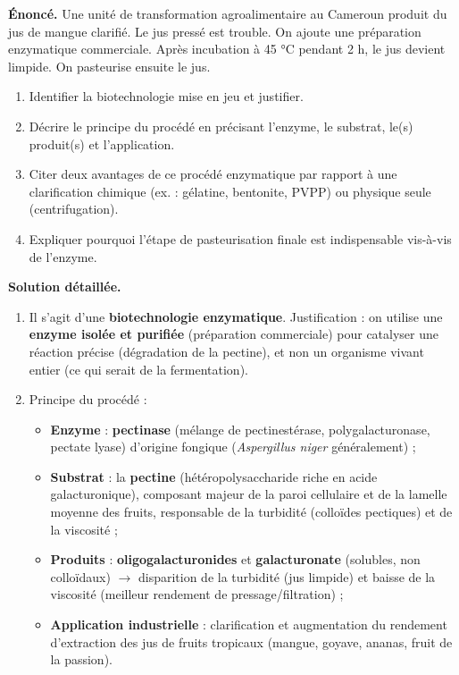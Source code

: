 \documentclass[11pt]{article}
\begin{document}
\begin{exoresolu}
\textbf{Énoncé.} Une unité de transformation agroalimentaire au Cameroun produit du jus de mangue clarifié. Le jus pressé est trouble. On ajoute une préparation enzymatique commerciale. Après incubation à 45 °C pendant 2 h, le jus devient limpide. On pasteurise ensuite le jus.
\begin{enumerate}
\item Identifier la biotechnologie mise en jeu et justifier.
\item Décrire le principe du procédé en précisant l'enzyme, le substrat, le(s) produit(s) et l'application.
\item Citer deux avantages de ce procédé enzymatique par rapport à une clarification chimique (ex. : gélatine, bentonite, PVPP) ou physique seule (centrifugation).
\item Expliquer pourquoi l'étape de pasteurisation finale est indispensable vis-à-vis de l'enzyme.
\end{enumerate}
\tcblower
\textbf{Solution détaillée.}
\begin{enumerate}
\item Il s'agit d'une \textbf{biotechnologie enzymatique}. Justification : on utilise une \textbf{enzyme isolée et purifiée} (préparation commerciale) pour catalyser une réaction précise (dégradation de la pectine), et non un organisme vivant entier (ce qui serait de la fermentation).
\item Principe du procédé :
\begin{itemize}
\item \textbf{Enzyme} : \textbf{pectinase} (mélange de pectinestérase, polygalacturonase, pectate lyase) d'origine fongique (\emph{Aspergillus niger} généralement) ;
\item \textbf{Substrat} : la \textbf{pectine} (hétéropolysaccharide riche en acide galacturonique), composant majeur de la paroi cellulaire et de la lamelle moyenne des fruits, responsable de la turbidité (colloïdes pectiques) et de la viscosité ;
\item \textbf{Produits} : \textbf{oligogalacturonides} et \textbf{galacturonate} (solubles, non colloïdaux) $\rightarrow$ disparition de la turbidité (jus limpide) et baisse de la viscosité (meilleur rendement de pressage/filtration) ;
\item \textbf{Application industrielle} : clarification et augmentation du rendement d'extraction des jus de fruits tropicaux (mangue, goyave, ananas, fruit de la passion).

\end{itemize}
\end{enumerate}
\end{exoresolu}
\end{document}
